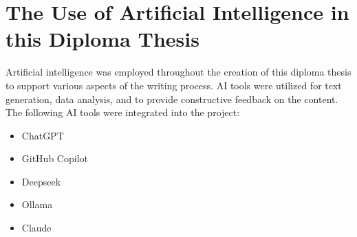 \section{The Use of Artificial Intelligence in this Diploma Thesis}

Artificial intelligence was employed throughout the creation of this diploma thesis to support various aspects of the writing process. AI tools were utilized for text generation, data analysis, and to provide constructive feedback on the content. The following AI tools were integrated into the project:

\begin{itemize}
    \item ChatGPT
    \item GitHub Copilot
    \item Deepseek
    \item Ollama
    \item Claude
\end{itemize}


